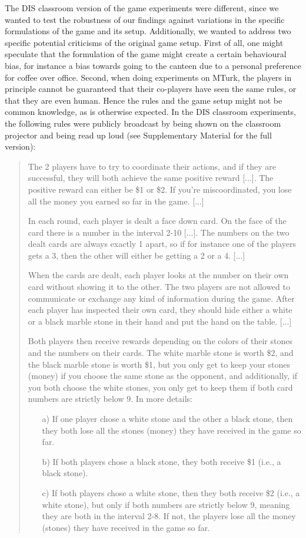 \documentclass[twocolumn,a4paper,superscriptaddress,nofootinbib]{revtex4}
\begin{document}
The DIS classroom version of the game experiments were different, since we wanted to test the robustness of our findings against variations in the specific formulations of the game and its setup. Additionally, we wanted to address two specific potential criticisms of the original game setup. First of all, one might speculate that the formulation of the game might create a certain behavioural bias, for instance a bias towards going to the canteen due to a personal preference for coffee over office. Second, when doing experiments on MTurk, the players  in principle cannot be guaranteed that their co-players have seen the same rules, or that they are even human. Hence the rules and the game setup might not be common knowledge, as is otherwise expected. In the DIS classroom experiments, the following rules were publicly broadcast by being shown on the classroom projector and being read up loud (see Supplementary Material for the full version): 
\begin{quote}
\indent
The 2 players have to try to coordinate their actions, and if they are successful, they will both achieve the same positive reward [...]. The positive reward can either be \$1 or \$2. If you’re miscoordinated, you lose all the money you earned so far in the game. [...] 
  
In each round, each player is dealt a face down card. On the face of the card there is a number in the interval 2-10 [...]. The numbers on the two dealt cards are always exactly 1 apart, so if for instance one of the players gets a 3, then the other will either be getting a 2 or a 4. [...] 

When the cards are dealt, each player looks at the number on their own card without showing it to the other. The two players are not allowed to communicate or exchange any kind of information during the game. After each player has inspected their own card, they should hide either a white or a black marble stone in their hand and put the hand on the table. [...] 

Both players then receive rewards depending on the colors of their stones and the numbers on their cards. The white marble stone is worth \$2, and the black marble stone is worth \$1, but you only get to keep your stones (money) if you choose the same stone as the opponent, and additionally, if you both choose the white stones, you only get to keep them if both card numbers are strictly below 9. In more details:  
\begin{enumerate}
  \item[a)] If one player chose a white stone and the other a black stone, then they both lose all the stones (money) they have received in the game so far.    
  \item[b)] If both players chose a black stone, they both receive \$1 (i.e., a black stone). 
  \item[c)] If both players chose a white stone, then they both receive \$2 (i.e., a white stone), but only if both numbers are strictly below 9, meaning they are both in the interval 2-8. If not, the players lose all the money (stones) they have received in the game so far.
\end{enumerate}
\end{quote}
\end{document}

